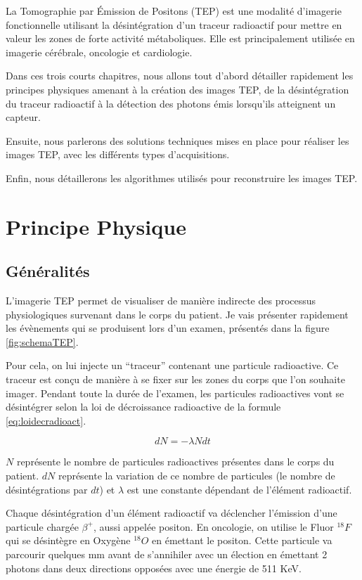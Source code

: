 
\label{lab:chapPET}
La Tomographie par \'Emission de Positons (TEP) est une modalité d'imagerie fonctionnelle utilisant la désintégration d'un traceur radioactif pour mettre en valeur les zones de forte activité métaboliques. Elle est principalement utilisée en imagerie cérébrale, oncologie et cardiologie.

Dans ces trois courts chapitres, nous allons tout d'abord détailler rapidement les principes physiques amenant à la création des images TEP, de la désintégration du traceur radioactif à la détection des photons émis lorsqu'ils atteignent un capteur. 

Ensuite, nous parlerons des solutions techniques mises en place pour réaliser les images TEP, avec les différents types d'acquisitions.

Enfin, nous détaillerons les algorithmes utilisés pour reconstruire les images TEP.

 
\chapter{Principe Physique}


	\section{Généralités}

L'imagerie TEP permet de visualiser de manière indirecte des processus physiologiques survenant dans le corps du patient. Je vais présenter rapidement les évènements qui se produisent lors d'un examen, présentés dans la figure \ref{fig:schemaTEP}.

Pour cela, on lui injecte un ``traceur'' contenant une particule radioactive. Ce traceur est conçu de manière à se fixer sur les zones du corps que l'on souhaite imager. Pendant toute la durée de l'examen, les particules radioactives vont se désintégrer selon la loi de décroissance radioactive de la formule \ref{eq:loidecradioact}.

\begin{equation}
	dN = - \lambda N dt
	\label{eq:loidecradioact}
\end{equation}

$N$ représente le nombre de particules radioactives présentes dans le corps du patient. $dN$ représente la variation de ce nombre de particules (le nombre de désintégrations par $dt$) et $\lambda$ est une constante dépendant de l'élément radioactif.

Chaque désintégration d'un élément radioactif va déclencher l'émission d'une particule chargée $\beta^+$, aussi appelée positon. En oncologie, on utilise le Fluor $^{18}F$ qui se désintègre en Oxygène $^{18}O$ en émettant le positon. Cette particule va parcourir quelques mm avant de s'annihiler avec un élection en émettant 2 photons dans deux directions opposées avec une énergie de 511 KeV.

